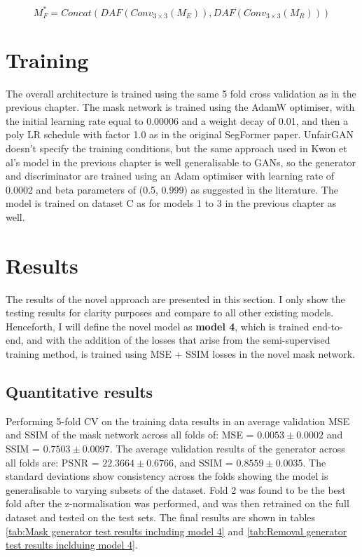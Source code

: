 \documentclass[11pt]{ociamthesis}  %
\begin{document}
\begin{equation}
    M^*_F = Concat(DAF(Conv_{3\times3}(M_E)),DAF(Conv_{3\times3}(M_R)))
    \label{Eq:AAM equation}
\end{equation}

\section{Training}

The overall architecture is trained using the same 5 fold cross validation as in the previous chapter. The mask network is trained using the AdamW optimiser, with the initial learning rate equal to 0.00006 and a weight decay of 0.01, and then a poly LR schedule with factor 1.0 as in the original SegFormer paper\cite{SegFormer}. UnfairGAN doesn't specify the training conditions, but the same approach used in Kwon et al's\cite{Kwon} model in the previous chapter is well generalisable to GANs, so the generator and discriminator are trained using an Adam optimiser with learning rate of 0.0002 and beta parameters of (0.5, 0.999) as suggested in the literature. The model is trained on dataset C as for models 1 to 3 in the previous chapter as well.

\section{Results}
The results of the novel approach are presented in this section. I only show the testing results for clarity purposes and compare to all other existing models. Henceforth, I will define the novel model as \textbf{model 4}, which is trained end-to-end, and with the addition of the losses that arise from the semi-supervised training method, is trained using MSE + SSIM losses in the novel mask network.  

\subsection{Quantitative results}
Performing 5-fold CV on the training data results in an average validation MSE and SSIM of the mask network across all folds of: MSE = $0.0053 \pm 0.0002$ and SSIM = $0.7503 \pm 0.0097$. The average validation results of the generator across all folds are: PSNR = $22.3664 \pm 0.6766$, and SSIM = $0.8559 \pm 0.0035$. The standard deviations show consistency across the folds showing the model is generalisable to varying subsets of the dataset. Fold 2 was found to be the best fold after the z-normalisation was performed, and was then retrained on the full dataset and tested on the test sets. The final results are shown in tables \ref{tab:Mask generator test results including model 4} and \ref{tab:Removal generator test results inclduing model 4}.
\end{document}
